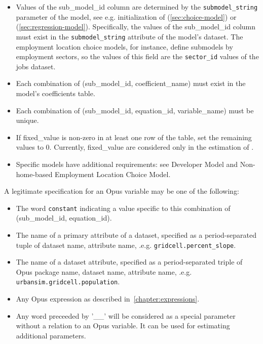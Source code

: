 \begin{itemize} \tight
\item Values of the sub_model_id column are
determined by the \verb|submodel_string| parameter of the model, see e.g. initialization of  
(\ref{sec:choice-model})
or  (\ref{sec:regression-model}). Specifically, the values of the sub_model_id column must 
exist in the \verb|submodel_string| attribute of the model's dataset.
The employment location choice models, for instance, define submodels by
employment sectors, so the values of this field are the
\verb|sector_id| values
of the jobs dataset. 
\item Each combination of (sub_model_id, coefficient_name)
must exist in the model's coefficients table.
\item Each combination of (sub_model_id, equation_id, variable_name) must be unique.
\item If fixed_value is non-zero in at least one row of the table, set the remaining values to 0. Currently, fixed_value 
are considered only in the estimation of .
\item Specific models have additional requirements: see Developer Model and Non-home-based Employment Location Choice Model. 
\end{itemize}

A legitimate specification for an Opus variable may be one of the following:

\begin{itemize}

\item The word \verb|constant| indicating a value specific to this combination
of (sub_model_id, equation_id).

\item The name of a primary attribute of a dataset, specified as a period-separated
tuple of dataset name, attribute name, .e.g.
\verb|gridcell.percent_slope|.

\item The name of a dataset attribute, specified as a period-separated triple of
Opus package name, dataset name, attribute name, .e.g. \verb|urbansim.gridcell.population|.

\item Any Opus expression as described in~\ref{chapter:expressions}.
 
\item Any word preceeded by '__' will be considered as a special parameter without a relation to an Opus variable.
It can be used for estimating additional parameters.
\end{itemize}

